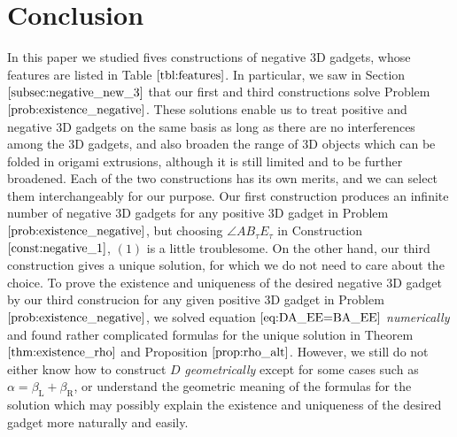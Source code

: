 \documentclass[11pt]{amsart}
\numberwithin{equation}{section}
\numberwithin{theorem}{section}
\newcommand{\Lt}{\ensuremath{\mathrm{L}}}
\newcommand{\Rt}{\ensuremath{\mathrm{R}}}
\begin{document}
\section{Conclusion}\label{sec:conclusion}
In this paper we studied fives constructions of negative $3$D gadgets, whose features are listed in Table $\ref{tbl:features}$.
In particular, we saw in Section $\ref{subsec:negative_new_3}$
that our first and third constructions solve Problem $\ref{prob:existence_negative}$.
These solutions enable us to treat positive and negative $3$D gadgets on the same basis as long as there are no interferences among the $3$D gadgets,
and also broaden the range of $3$D objects which can be folded in origami extrusions, although it is still limited and to be further broadened.
Each of the two constructions has its own merits, and we can select them interchangeably for our purpose.
Our first construction produces an infinite number of negative $3$D gadgets for any positive $3$D gadget in Problem $\ref{prob:existence_negative}$,
but choosing $\angle AB_\tau E_\tau$ in Construction $\ref{const:negative_1}$, $(1)$ is a little troublesome.
On the other hand, our third construction gives a unique solution, for which we do not need to care about the choice.
To prove the existence and uniqueness of the desired negative $3$D gadget by our third construcion
for any given positive $3$D gadget in Problem $\ref{prob:existence_negative}$,
we solved equation $\eqref{eq:DA_EE=BA_EE}$ \emph{numerically} and found rather complicated formulas for the unique solution
in Theorem $\ref{thm:existence_rho}$ and Proposition $\ref{prop:rho_alt}$.
However, we still do not either know how to construct $D$ \emph{geometrically} except for some cases such as $\alpha =\beta_\Lt +\beta_\Rt$,
or understand the geometric meaning of the formulas for the solution
which may possibly explain the existence and uniqueness of the desired gadget more naturally and easily.
\end{document}
